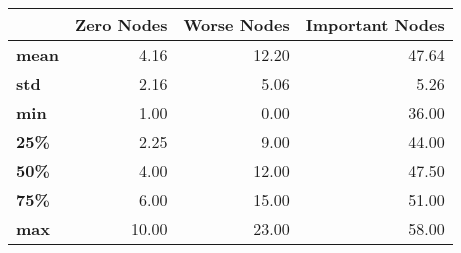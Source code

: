 \begin{tabular}{lrrr}
\toprule
{} &  Zero Nodes &  Worse Nodes &  Important Nodes \\
\midrule
\textbf{mean} &        4.16 &        12.20 &            47.64 \\
\textbf{std } &        2.16 &         5.06 &             5.26 \\
\textbf{min } &        1.00 &         0.00 &            36.00 \\
\textbf{25\% } &        2.25 &         9.00 &            44.00 \\
\textbf{50\% } &        4.00 &        12.00 &            47.50 \\
\textbf{75\% } &        6.00 &        15.00 &            51.00 \\
\textbf{max } &       10.00 &        23.00 &            58.00 \\
\bottomrule
\end{tabular}
